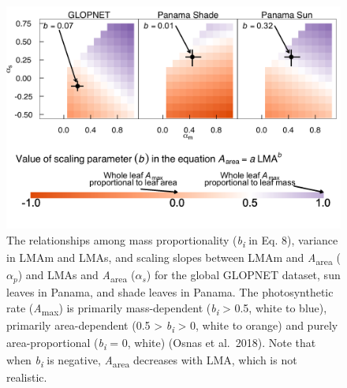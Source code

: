 \documentclass[
  12pt,
]{article}
\begin{document}
\begin{figure}
\hypertarget{fig:massplt}{%
\centering
\includegraphics{../figs/mass_prop4.png}
\caption{The relationships among mass proportionality (\emph{b\textsubscript{i}} in Eq. 8), variance in LMAm and LMAs, and scaling slopes between LMAm and \emph{A}\textsubscript{area} (\(\alpha_p\)) and LMAs and \emph{A}\textsubscript{area} (\(\alpha_s\)) for the global GLOPNET dataset, sun leaves in Panama, and shade leaves in Panama.
The photosynthetic rate (\emph{A}\textsubscript{max}) is primarily mass-dependent (\emph{b\textsubscript{i}} \textgreater{} 0.5, white to blue), primarily area-dependent (0.5 \textgreater{} \emph{b\textsubscript{i}} \textgreater{} 0, white to orange) and purely area-proportional (\emph{b\textsubscript{i}} = 0, white) (Osnas et al.~2018).
Note that when \emph{b\textsubscript{i}} is negative, \emph{A}\textsubscript{area} decreases with LMA, which is not realistic.}\label{fig:massplt}
}
\end{figure}

\newpage
\end{document}
